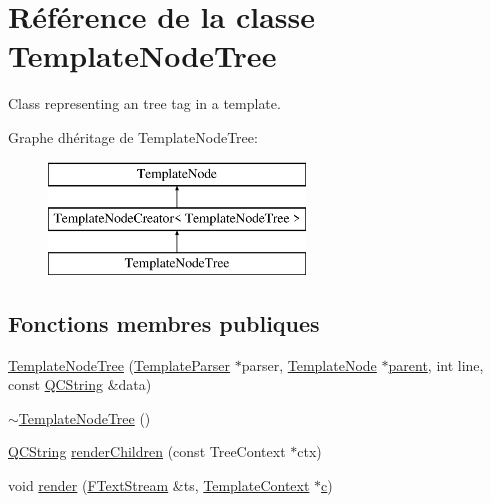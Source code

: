 \hypertarget{class_template_node_tree}{}\section{Référence de la classe Template\+Node\+Tree}
\label{class_template_node_tree}


Class representing an \textquotesingle{}tree\textquotesingle{} tag in a template.  


Graphe d\textquotesingle{}héritage de Template\+Node\+Tree\+:\begin{figure}[H]
\begin{center}
\leavevmode
\includegraphics[height=3.000000cm]{class_template_node_tree}
\end{center}
\end{figure}
\subsection*{Fonctions membres publiques}
\begin{DoxyCompactItemize}
\item 
\hyperlink{class_template_node_tree_a7073702e447b60cf5163f0114330ae34}{Template\+Node\+Tree} (\hyperlink{class_template_parser}{Template\+Parser} $\ast$parser, \hyperlink{class_template_node}{Template\+Node} $\ast$\hyperlink{class_template_node_a69a306ef84e62af9fe57bf9aacc94536}{parent}, int line, const \hyperlink{class_q_c_string}{Q\+C\+String} \&data)
\item 
\hyperlink{class_template_node_tree_acbb8c5f2c5455cb70c4aaf8ca0611523}{$\sim$\+Template\+Node\+Tree} ()
\item 
\hyperlink{class_q_c_string}{Q\+C\+String} \hyperlink{class_template_node_tree_a9e003555c8ce1065a8446e3a26b64888}{render\+Children} (const Tree\+Context $\ast$ctx)
\item 
void \hyperlink{class_template_node_tree_a69eb441fb4be81adaab307cbfb158363}{render} (\hyperlink{class_f_text_stream}{F\+Text\+Stream} \&ts, \hyperlink{class_template_context}{Template\+Context} $\ast$\hyperlink{060__command__switch_8tcl_ab14f56bc3bd7680490ece4ad7815465f}{c})
\end{DoxyCompactItemize}
